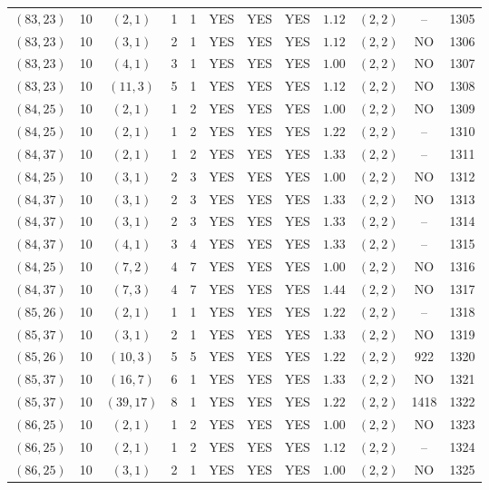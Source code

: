 \begin{longtable}{|c|c|c|c|c|c|c|c|c|c|c|c|}
$(83,23)$ & 10 & $(2,1)$ & 1 & 1 & YES & YES & YES & $1.12$ & $(2,2)$ & -- & 1305\\
$(83,23)$ & 10 & $(3,1)$ & 2 & 1 & YES & YES & YES & $1.12$ & $(2,2)$ & NO & 1306\\
$(83,23)$ & 10 & $(4,1)$ & 3 & 1 & YES & YES & YES & $1.00$ & $(2,2)$ & NO & 1307\\
$(83,23)$ & 10 & $(11,3)$ & 5 & 1 & YES & YES & YES & $1.12$ & $(2,2)$ & NO & 1308\\
$(84,25)$ & 10 & $(2,1)$ & 1 & 2 & YES & YES & YES & $1.00$ & $(2,2)$ & NO & 1309\\
$(84,25)$ & 10 & $(2,1)$ & 1 & 2 & YES & YES & YES & $1.22$ & $(2,2)$ & -- & 1310\\
$(84,37)$ & 10 & $(2,1)$ & 1 & 2 & YES & YES & YES & $1.33$ & $(2,2)$ & -- & 1311\\
$(84,25)$ & 10 & $(3,1)$ & 2 & 3 & YES & YES & YES & $1.00$ & $(2,2)$ & NO & 1312\\
$(84,37)$ & 10 & $(3,1)$ & 2 & 3 & YES & YES & YES & $1.33$ & $(2,2)$ & NO & 1313\\
$(84,37)$ & 10 & $(3,1)$ & 2 & 3 & YES & YES & YES & $1.33$ & $(2,2)$ & -- & 1314\\
$(84,37)$ & 10 & $(4,1)$ & 3 & 4 & YES & YES & YES & $1.33$ & $(2,2)$ & -- & 1315\\
$(84,25)$ & 10 & $(7,2)$ & 4 & 7 & YES & YES & YES & $1.00$ & $(2,2)$ & NO & 1316\\
$(84,37)$ & 10 & $(7,3)$ & 4 & 7 & YES & YES & YES & $1.44$ & $(2,2)$ & NO & 1317\\
$(85,26)$ & 10 & $(2,1)$ & 1 & 1 & YES & YES & YES & $1.22$ & $(2,2)$ & -- & 1318\\
$(85,37)$ & 10 & $(3,1)$ & 2 & 1 & YES & YES & YES & $1.33$ & $(2,2)$ & NO & 1319\\
$(85,26)$ & 10 & $(10,3)$ & 5 & 5 & YES & YES & YES & $1.22$ & $(2,2)$ & 922 & 1320\\
$(85,37)$ & 10 & $(16,7)$ & 6 & 1 & YES & YES & YES & $1.33$ & $(2,2)$ & NO & 1321\\
$(85,37)$ & 10 & $(39,17)$ & 8 & 1 & YES & YES & YES & $1.22$ & $(2,2)$ & 1418 & 1322\\
$(86,25)$ & 10 & $(2,1)$ & 1 & 2 & YES & YES & YES & $1.00$ & $(2,2)$ & NO & 1323\\
$(86,25)$ & 10 & $(2,1)$ & 1 & 2 & YES & YES & YES & $1.12$ & $(2,2)$ & -- & 1324\\
$(86,25)$ & 10 & $(3,1)$ & 2 & 1 & YES & YES & YES & $1.00$ & $(2,2)$ & NO & 1325\\

\end{longtable}
